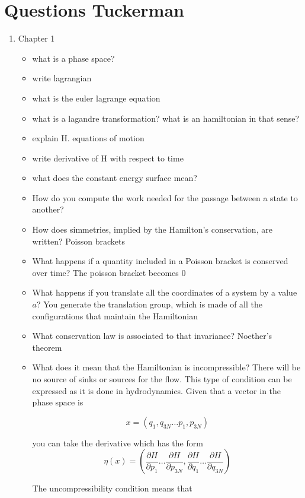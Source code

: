 \section{Questions Tuckerman}

\begin{enumerate}
    \item Chapter 1
    \begin{itemize}
        \item what is a phase space?
        \item write lagrangian
        \item what is the euler lagrange equation
        \item what is a lagandre transformation? what is  an hamiltonian in that sense?
        \item explain H. equations of motion
        \item write derivative of H with respect to time 
        \item what does the constant energy surface mean?
        \item How do you compute the work needed for the passage between a state to another?
        \item How does simmetries, implied by the Hamilton's conservation, are written? Poisson brackets
        \item What happens if a quantity included in a Poisson bracket is conserved over time? The poisson bracket becomes 0
        \item What happens if you translate all the coordinates of a system by a value $a$? You generate the translation group, which is made of all the configurations that maintain the Hamiltonian
        \item What conservation law is associated to that invariance? Noether's theorem 
        \item What does it mean that the Hamiltonian is incompressible? There will be no source of sinks or sources for the flow. This type of condition can be expressed as it is done in hydrodynamics. Given that a vector in the phase space is

        $$
        x = (q_1, q_{3N} \dots p_1, p_{3N})
        $$

        you can take the derivative which has the form
        $$
        \eta (x) = \left(\frac{\partial H}{\partial p_1} \dots \frac{\partial H}{\partial p_{3N}}, \frac{\partial H}{\partial q_1} \dots \frac{\partial H}{\partial q_{3N}}\right) 
        $$

        The uncompressibility condition means that 


\end{itemize}
\end{enumerate}
